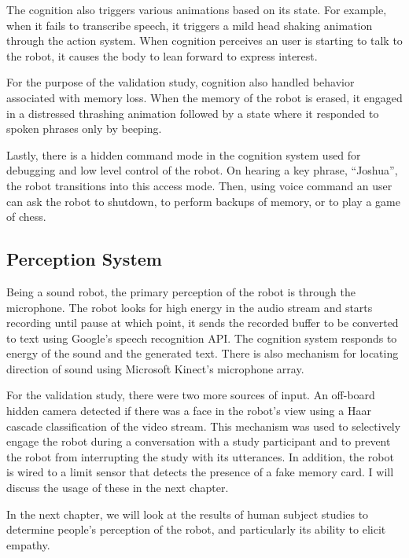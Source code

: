 The cognition also triggers various animations based on its state. For example, when it fails to transcribe speech, it triggers a mild head shaking animation through the action system. When cognition perceives an user is starting to talk to the robot, it causes the body to lean forward to express interest.  

For the purpose of the validation study, cognition also handled behavior associated with memory loss. When the memory of the robot is erased, it engaged in a distressed thrashing animation followed by a state where it responded to spoken phrases only by beeping. 

Lastly, there is a hidden command mode in the cognition system used for debugging and low level control of the robot. On hearing a key phrase, ``Joshua'', the robot transitions into this access mode. Then, using voice command an user can ask the robot to shutdown, to perform backups of memory, or to play a game of chess. 

\subsection{Perception System}

Being a sound robot, the primary perception of the robot is through the microphone. The robot looks for high energy in the audio stream and starts recording until pause at which point, it sends the recorded buffer to be converted to text using Google's speech recognition API. The cognition system responds to energy of the sound and the generated text. There is also mechanism for locating direction of sound using Microsoft Kinect's microphone array.

For the validation study, there were two more sources of input. An off-board hidden camera detected if there was  a face in the robot's view using a Haar cascade classification of the video stream. This mechanism was used to selectively engage the robot during a conversation with a study participant and to prevent the robot from interrupting the study with its utterances. In addition, the robot is wired to a limit sensor that detects the presence of a fake memory card. I will discuss the usage of these in the next chapter. 



In the next chapter, we will look at the results of human subject studies to determine people's perception of the robot, and particularly its ability to elicit empathy.















